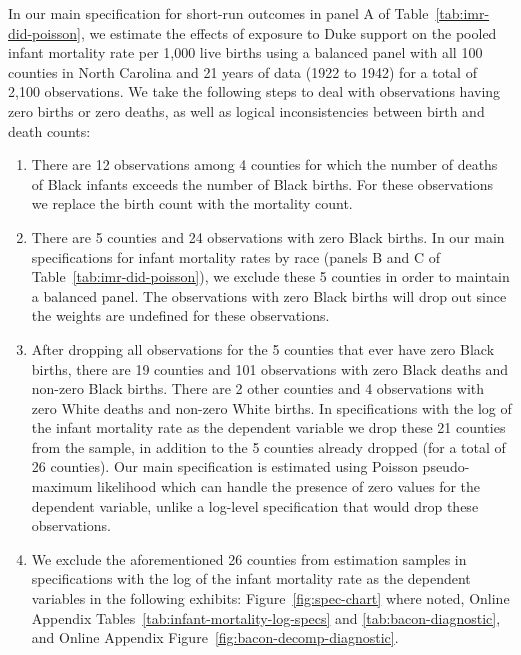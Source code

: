 \documentclass[12pt]{article}
\begin{document}
In our main specification for short-run outcomes in panel A of Table~\ref{tab:imr-did-poisson}, we estimate the effects of exposure to Duke support on the pooled infant mortality rate per 1,000 live births using a balanced panel with all 100 counties in North Carolina and 21 years of data (1922 to 1942) for a total of 2,100 observations. We take the following steps to deal with observations having zero births or zero deaths, as well as logical inconsistencies between birth and death counts:
\begin{enumerate}
    \item There are 12 observations among 4 counties for which the number of deaths of Black infants exceeds the number of Black births. For these observations we replace the birth count with the mortality count.
    \item There are 5 counties and 24 observations with zero Black births. In our main specifications for infant mortality rates by race (panels B and C of Table~\ref{tab:imr-did-poisson}), we exclude these 5 counties in order to maintain a balanced panel. The observations with zero Black births will drop out since the weights are undefined for these observations.
    \item After dropping all observations for the 5 counties that ever have zero Black births, there are 19 counties and 101 observations with zero Black deaths and non-zero Black births. There are 2 other counties and 4 observations with zero White deaths and non-zero White births. In specifications with the log of the infant mortality rate as the dependent variable we drop these 21 counties from the sample, in addition to the 5 counties already dropped (for a total of 26 counties). Our main specification is estimated using Poisson pseudo-maximum likelihood which can handle the presence of zero values for the dependent variable, unlike a log-level specification that would drop these observations.
    \item We exclude the aforementioned 26 counties from estimation samples in specifications with the log of the infant mortality rate as the dependent variables in the following exhibits: Figure~\ref{fig:spec-chart} where noted, Online Appendix Tables~\ref{tab:infant-mortality-log-specs} and \ref{tab:bacon-diagnostic}, and Online Appendix Figure~\ref{fig:bacon-decomp-diagnostic}.
\end{enumerate}


\end{document}
